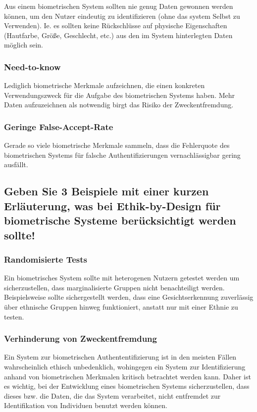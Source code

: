 \documentclass{article}
\begin{document}
Aus einem biometrischen System sollten nie genug Daten gewonnen werden können, um den Nutzer eindeutig zu 
identifizieren (ohne das system Selbst zu Verwenden). Ie. es sollten keine Rückschlüsse auf physische 
Eigenschaften (Hautfarbe, Größe, Geschlecht, etc.) aus den im System hinterlegten Daten möglich sein.

\subsubsection*{Need-to-know}

Lediglich biometrische Merkmale aufzeichnen, die einen konkreten Verwendungszweck für die Aufgabe des 
biometrischen Systems haben. Mehr Daten aufzuzeichnen als notwendig birgt das Risiko der Zweckentfremdung.

\subsubsection*{Geringe False-Accept-Rate}

Gerade so viele biometrische Merkmale sammeln, dass die Fehlerquote des biometrischen Systems für falsche 
Authentifizierungen vernachlässigbar gering ausfällt. 

\subsection{Geben Sie 3 Beispiele mit einer kurzen Erläuterung, was bei Ethik-by-Design für biometrische Systeme berücksichtigt werden sollte!}

\subsubsection*{Randomisierte Tests}

Ein biometrisches System sollte mit heterogenen Nutzern getestet werden um sicherzustellen, dass 
marginalisierte Gruppen nicht benachteiligt werden. Beispielsweise sollte sichergestellt werden, dass eine 
Gesichtserkennung zuverlässig über ethnische Gruppen hinweg funktioniert, anstatt nur mit einer Ethnie zu 
testen.

\subsubsection*{Verhinderung von Zweckentfremdung}

Ein System zur biometrischen Authententifizierung ist in den meisten Fällen wahrscheinlich ethisch 
unbedenklich, wohingegen ein System zur Identifizierung anhand von biometrischen Merkmalen kritisch 
betrachtet werden kann. Daher ist es wichtig, bei der Entwicklung eines biometrischen Systems 
sicherzustellen, dass dieses bzw. die Daten, die das System verarbeitet, nicht entfremdet zur 
Identifikation von Individuen benutzt werden können.
\end{document}
